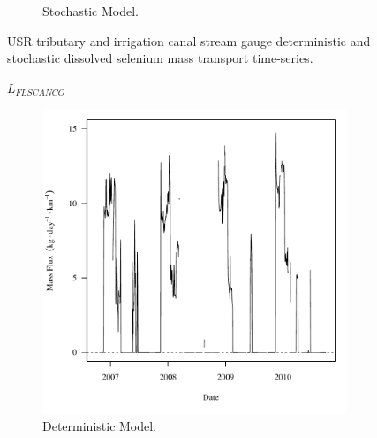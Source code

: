 \begin{linenumbers}
\begin{landscape}
\begin{figure}
\begin{subfigure}{0.7\textwidth}
			\caption{Stochastic Model.}
		\end{subfigure}
		\caption{USR tributary and irrigation canal stream gauge deterministic and stochastic dissolved selenium mass transport time-series.}
	\end{figure}
\end{landscape}
\subfiguremid
\begin{landscape}
	\begin{figure}
		$ \displaystyle L_{FLSCANCO} $
		\begin{subfigure}{0.7\textwidth}
			\centering
			\includegraphics[width=\tableCustomSize]{"Figures/Results_USR/Deterministic/f FLS"}
			\caption{Deterministic Model.}
		\end{subfigure}%
		\begin{subfigure}{0.7\textwidth}
			\centering

\end{subfigure}
\end{figure}
\end{landscape}
\end{linenumbers}
